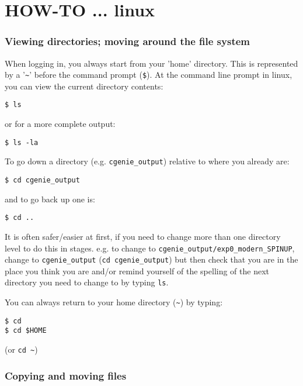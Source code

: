 \documentclass[11pt,fleqn]{book} %
\begin{document}
\newpage


\section{HOW-TO ... linux}\label{how-to-linux}
\vspace{2mm}

%
\subsubsection{Viewing directories; moving around the file system}

When logging in, you always start from your 'home' directory. This is represented by a '\texttt{\~}'
before the command prompt (\texttt{\$}).
At the command line prompt in linux, you can view the current directory contents:
\begin{verbatim}
$ ls
\end{verbatim}
or for a more complete output:
\begin{verbatim}
$ ls -la
\end{verbatim}
To go down a directory (e.g. \texttt{cgenie\_output}) relative to where you already are:
\begin{verbatim}
$ cd cgenie_output
\end{verbatim}
and to go back up one is:
\begin{verbatim}
$ cd ..
\end{verbatim}

It is often safer/easier at first, if you need to change more than one directory level to do this in stages. e.g. to change to \texttt{cgenie\_output/exp0\_modern\_SPINUP}, change to \texttt{cgenie\_output} (\texttt{cd cgenie\_output}) but then check that you are in the place you think you are and/or remind yourself of the spelling of the next directory you need to change to by typing \texttt{ls}.

You can always return to your home directory (\texttt{\~}) by typing:
\begin{verbatim}
$ cd
$ cd $HOME
\end{verbatim}
(or \texttt{cd \~})

%
\subsubsection{Copying and moving files}
\end{document}
